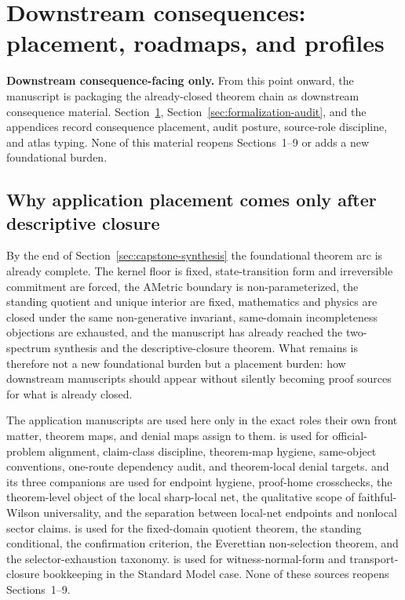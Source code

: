 \section{Downstream consequences: placement, roadmaps, and profiles}
\label{sec:consequence-pathways}

\begin{fixedbox}
\textbf{Downstream consequence-facing only.} From this point onward, the manuscript is packaging the already-closed theorem chain as downstream consequence material. Section~\ref{sec:consequence-pathways}, Section~\ref{sec:formalization-audit}, and the appendices record consequence placement, audit posture, source-role discipline, and atlas typing. None of this material reopens Sections~1--9 or adds a new foundational burden.
\end{fixedbox}

\subsection{Why application placement comes only after descriptive closure}

By the end of Section~\ref{sec:capstone-synthesis} the foundational theorem arc is already complete. The kernel floor is fixed, state-transition form and irreversible commitment are forced, the AMetric boundary is non-parameterized, the standing quotient and unique interior are fixed, mathematics and physics are closed under the same non-generative invariant, same-domain incompleteness objections are exhausted, and the manuscript has already reached the two-spectrum synthesis and the descriptive-closure theorem. What remains is therefore not a new foundational burden but a placement burden: how downstream manuscripts should appear without silently becoming proof sources for what is already closed.

\begin{importnote}
The application manuscripts are used here only in the exact roles their own front matter, theorem maps, and denial maps assign to them. \nsdoc{} is used for official-problem alignment, claim-class discipline, theorem-map hygiene, same-object conventions, one-route dependency audit, and theorem-local denial targets. \ymmaindoc{} and its three companions are used for endpoint hygiene, proof-home crosschecks, the theorem-level object of the local sharp-local net, the qualitative scope of faithful-Wilson universality, and the separation between local-net endpoints and nonlocal sector claims. \measurementdoc{} is used for the fixed-domain quotient theorem, the standing conditional, the confirmation criterion, the Everettian non-selection theorem, and the selector-exhaustion taxonomy. \structuradoc{} is used for witness-normal-form and transport-closure bookkeeping in the Standard Model case. None of these sources reopens Sections~1--9.
\end{importnote}

